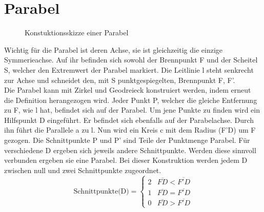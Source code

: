 \section{Parabel}
\begin{figure}[h]
	\centering
		\resizebox{.5\linewidth}{!}{
			
		}
	\caption{Konstuktionsskizze einer Parabel}
\end{figure}
Wichtig für die Parabel ist deren Achse, sie ist gleichzeitig die einzige Symmerieachse. Auf ihr befinden sich sowohl der Brennpunkt F und der Scheitel S, welcher den Extremwert der Parabel markiert. Die Leitlinie l steht senkrecht zur Achse und schneidet den, mit S punktgespiegelten, Brennpunkt F, F'.\\
Die Parabel kann mit Zirkel und Geodreieck konstruiert werden, indem erneut die Definition herangezogen wird. Jeder Punkt P, welcher die gleiche Entfernung zu F, wie l hat, befindet sich auf der Parabel. Um jene Punkte zu finden wird ein Hilfspunkt D eingeführt. Er befindet sich ebenfalls auf der Parabelachse. Durch ihn führt die Parallele a zu l. Nun wird ein Kreis c mit dem Radius (F'D) um F gezogen. Die Schnittpunkte P und P' sind Teile der Punktmenge Parabel. Für verschiedene D ergeben sich jeweils andere Schnittpunkte. Werden diese sinnvoll verbunden ergeben sie eine Parabel. Bei dieser Konstruktion werden jedem D zwischen null und zwei Schnittpunkte zugeordnet.
\begin{displaymath}
   \text{Schnittpunkte(D)} = \left\{
     \begin{array}{lr}
       2 & \overline{FD} < \overline{F'D}\\
       1 & \overline{FD} = \overline{F'D}\\
       0 & \overline{FD} > \overline{F'D}
     \end{array}
   \right.
\end{displaymath}
